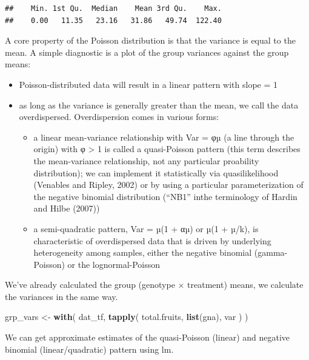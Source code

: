 \documentclass[
  12pt,
]{book}
\newenvironment{Shaded}{\begin{snugshade}}{\end{snugshade}}
\newcommand{\KeywordTok}[1]{\textcolor[rgb]{0.13,0.29,0.53}{\textbf{#1}}}
\newcommand{\NormalTok}[1]{#1}
\newcommand{\StringTok}[1]{\textcolor[rgb]{0.31,0.60,0.02}{#1}}
\providecommand{\tightlist}{%
  \setlength{\itemsep}{0pt}\setlength{\parskip}{0pt}}
\begin{document}
\begin{verbatim}
##    Min. 1st Qu.  Median    Mean 3rd Qu.    Max. 
##    0.00   11.35   23.16   31.86   49.74  122.40
\end{verbatim}

A core property of the Poisson distribution is that the variance is equal to the mean. A simple diagnostic is a plot of the group variances against the group means:

\begin{itemize}
\tightlist
\item
  Poisson-distributed data will result in a linear pattern with slope = 1
\item
  as long as the variance is generally greater than the mean, we call the data overdispersed. Overdispersion comes in various forms:

  \begin{itemize}
  \tightlist
  \item
    a linear mean-variance relationship with Var = φµ (a line through the origin) with φ \textgreater{} 1 is called a quasi-Poisson pattern (this term describes the mean-variance relationship, not any particular proability distribution); we can implement it statistically via quasilikelihood (Venables and Ripley, 2002) or by using a particular parameterization of the negative binomial distribution (``NB1'' inthe terminology of Hardin and Hilbe (2007))
  \item
    a semi-quadratic pattern, Var = µ(1 + αµ) or µ(1 + µ/k), is characteristic of overdispersed data that is driven by underlying heterogeneity among samples, either the negative binomial (gamma-Poisson) or the lognormal-Poisson \citep{elston2001}
  \end{itemize}
\end{itemize}

We've already calculated the group (genotype × treatment) means, we calculate the variances in the same way.

\begin{Shaded}
\begin{Highlighting}[]
\NormalTok{grp_vars <-}\StringTok{ }\KeywordTok{with}\NormalTok{(}
\NormalTok{  dat_tf,}
  \KeywordTok{tapply}\NormalTok{(}
\NormalTok{    total.fruits,}
    \KeywordTok{list}\NormalTok{(gna), var}
\NormalTok{  )}
\NormalTok{)}
\end{Highlighting}
\end{Shaded}

We can get approximate estimates of the quasi-Poisson (linear) and negative binomial (linear/quadratic) pattern using lm.
\end{document}
